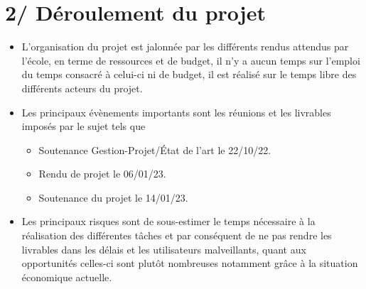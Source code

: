 \documentclass{report}
\begin{document}
\section*{2/ Déroulement du projet}
\begin{itemize}
    \item L'organisation du projet est jalonnée par les différents rendus attendus par l'école, en terme de ressources et de budget, il n'y a aucun temps sur l'emploi du temps consacré à celui-ci ni de budget, il est réalisé sur le temps libre des différents acteurs du projet.
    \item Les principaux évènements importants sont les réunions et les livrables imposés par le sujet tels que 
        \begin{itemize}
        \item Soutenance Gestion-Projet/État de l'art le 22/10/22.
        \item Rendu de projet le 06/01/23.
        \item Soutenance du projet le 14/01/23.
    \end{itemize}
    \item Les principaux risques sont de sous-estimer le temps nécessaire à la réalisation des différentes tâches et par conséquent de ne pas rendre les livrables dans les délais et les utilisateurs malveillants, quant aux opportunités celles-ci sont plutôt nombreuses notamment grâce à la situation économique actuelle.
\end{itemize}

\newpage
\begin{center}
    \textbf{\color{orange}{\Huge Cadrage}} \\
\end{center}


\newpage
\begin{center}
    \textbf{\color{orange}{\Huge Déroulement du projet}} \\
\end{center}
\end{document}
